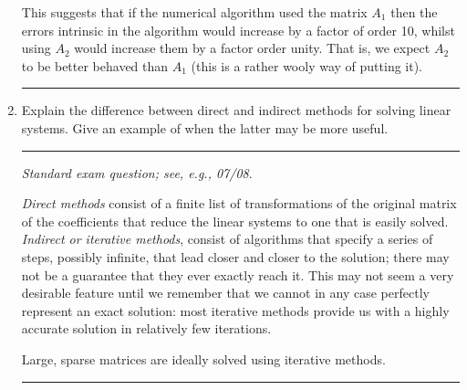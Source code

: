 \documentclass[10pt]{article}
\begin{document}
\begin{enumerate}
  This suggests that if the numerical algorithm used the matrix $A_1$
  then the errors intrinsic in the algorithm would increase by a
  factor of order 10, whilst using $A_2$ would increase them by a
  factor order unity. That is, we expect $A_2$ to be better behaved
  than $A_1$ (this is a rather wooly way of putting it).
  \begin{center}
    \rule{0.9\textwidth}{.1pt}
  \end{center}  
\item Explain the difference between direct and indirect methods for
  solving linear systems. Give an example of when the latter may be
  more useful.
  \begin{center}
    \rule{0.9\textwidth}{.1pt}
  \end{center}  
  {\it Standard exam question; see, e.g., 07/08}.

  \textit{Direct methods} consist of a finite list of transformations
  of the original matrix of the coefficients that reduce the linear
  systems to one that is easily solved.  \textit{Indirect or iterative
    methods}, consist of algorithms that specify a series of steps,
  possibly infinite, that lead closer and closer to the solution;
  there may not be a guarantee that they ever exactly reach it.  This
  may not seem a very desirable feature until we remember that we
  cannot in any case perfectly represent an exact solution: most
  iterative methods provide us with a highly accurate solution in
  relatively few iterations.

  Large, sparse matrices are ideally solved using iterative methods.
  \begin{center}
    \rule{0.9\textwidth}{.1pt}
  \end{center}  
\end{enumerate}
\end{document}
